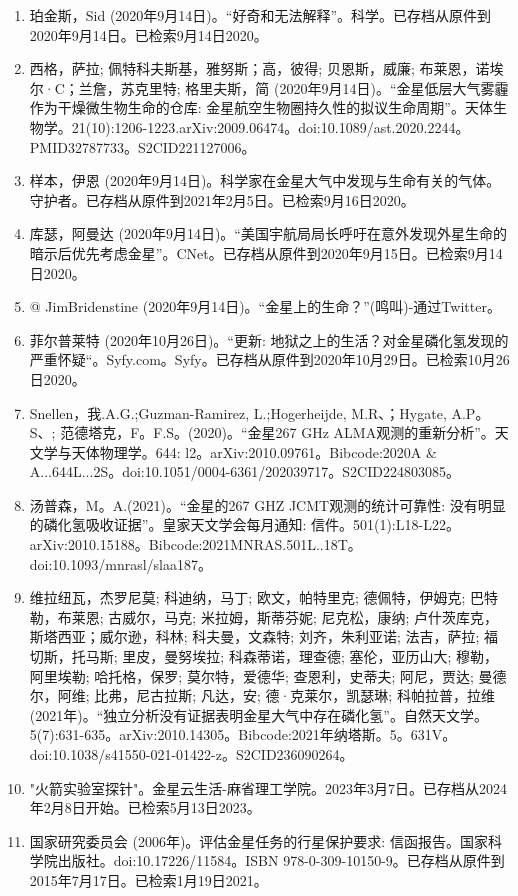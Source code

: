 \begin{enumerate}
\item 珀金斯，Sid (2020年9月14日)。“好奇和无法解释”。科学。已存档从原件到2020年9月14日。已检索9月14日2020。
\item 西格，萨拉; 佩特科夫斯基，雅努斯；高，彼得; 贝恩斯，威廉; 布莱恩，诺埃尔·C；兰詹，苏克里特; 格里夫斯，简 (2020年9月14日)。“金星低层大气雾霾作为干燥微生物生命的仓库: 金星航空生物圈持久性的拟议生命周期”。天体生物学。21(10):1206-1223.arXiv:2009.06474。doi:10.1089/ast.2020.2244。PMID32787733。S2CID221127006。  
\item 样本，伊恩 (2020年9月14日)。科学家在金星大气中发现与生命有关的气体。守护者。已存档从原件到2021年2月5日。已检索9月16日2020。
\item 库瑟，阿曼达 (2020年9月14日)。“美国宇航局局长呼吁在意外发现外星生命的暗示后优先考虑金星”。CNet。已存档从原件到2020年9月15日。已检索9月14日2020。
\item @ JimBridenstine (2020年9月14日)。“金星上的生命？”(鸣叫)-通过Twitter。
\item 菲尔普莱特 (2020年10月26日)。“更新: 地狱之上的生活？对金星磷化氢发现的严重怀疑“。Syfy.com。Syfy。已存档从原件到2020年10月29日。已检索10月26日2020。
\item Snellen，我.A.G.;Guzman-Ramirez, L.;Hogerheijde, M.R、；Hygate, A.P。S、; 范德塔克，F。F.S。(2020)。“金星267 GHz ALMA观测的重新分析”。天文学与天体物理学。644: l2。arXiv:2010.09761。Bibcode:2020A & A...644L...2S。doi:10.1051/0004-6361/202039717。S2CID224803085。 
\item 汤普森，M。A.(2021)。“金星的267 GHZ JCMT观测的统计可靠性: 没有明显的磷化氢吸收证据”。皇家天文学会每月通知: 信件。501(1):L18-L22。arXiv:2010.15188。Bibcode:2021MNRAS.501L..18T。doi:10.1093/mnrasl/slaa187。
\item 维拉纽瓦，杰罗尼莫; 科迪纳，马丁; 欧文，帕特里克; 德佩特，伊姆克; 巴特勒，布莱恩; 古威尔，马克; 米拉姆，斯蒂芬妮; 尼克松，康纳; 卢什茨库克，斯塔西亚；威尔逊，科林; 科夫曼，文森特; 刘齐，朱利亚诺; 法吉，萨拉; 福切斯，托马斯; 里皮，曼努埃拉; 科森蒂诺，理查德; 塞伦，亚历山大; 穆勒，阿里埃勒; 哈托格，保罗; 莫尔特，爱德华; 查恩利，史蒂夫; 阿尼，贾达; 曼德尔，阿维; 比弗，尼古拉斯; 凡达，安; 德·克莱尔，凯瑟琳; 科帕拉普，拉维 (2021年)。“独立分析没有证据表明金星大气中存在磷化氢”。自然天文学。5(7):631-635。arXiv:2010.14305。Bibcode:2021年纳塔斯。5。631V。doi:10.1038/s41550-021-01422-z。S2CID236090264。 
\item "火箭实验室探针"。金星云生活-麻省理工学院。2023年3月7日。已存档从2024年2月8日开始。已检索5月13日2023。
\item 国家研究委员会 (2006年)。评估金星任务的行星保护要求: 信函报告。国家科学院出版社。doi:10.17226/11584。ISBN 978-0-309-10150-9。已存档从原件到2015年7月17日。已检索1月19日2021。

\end{enumerate}
